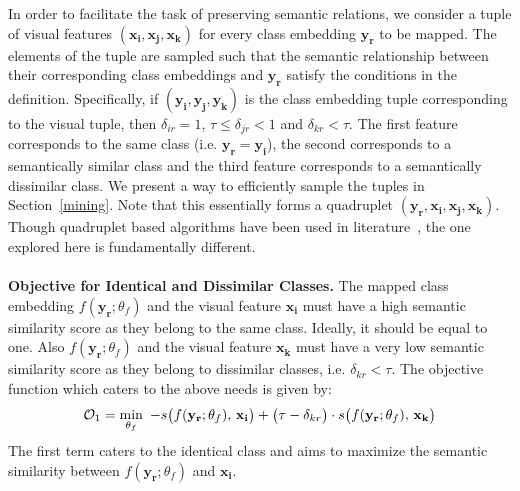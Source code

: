 \documentclass[10pt,twocolumn,letterpaper]{article}
\begin{document}
In order to facilitate the task of preserving semantic relations, we consider a tuple of visual features $(\mathbf{x_i},\mathbf{x_j},\mathbf{x_k})$ for every %
class embedding $\mathbf{y_r}$ to be mapped. 
The elements of the tuple are sampled such that the semantic relationship between their corresponding class embeddings and  $\mathbf{y_r}$ satisfy the conditions in the definition. 
Specifically, if $(\mathbf{y_i},\mathbf{y_j}, \mathbf{y_k})$ is the class embedding tuple corresponding to the visual tuple, then $\delta_{ir} = 1$, $\tau \leq \delta_{jr} < 1$ and $\delta_{kr} < \tau$. 
The first feature corresponds to the same class (i.e. $\mathbf{y_r}=\mathbf{y_i}$), the second corresponds to  a semantically similar class and the third feature corresponds to a semantically dissimilar class.
We present a way to efficiently sample the tuples in Section~\ref{mining}. 
Note that this essentially forms a quadruplet $(\mathbf{y_r},\mathbf{x_i},\mathbf{x_j}, \mathbf{x_k})$. 
Though quadruplet based algorithms have been used in literature~\cite{chen2017beyond}, the one explored here is fundamentally different. %
\\\\
\textbf{Objective for Identical and Dissimilar Classes.} The mapped class embedding $f(\mathbf{y_r};\theta_f)$ and the visual feature $\mathbf{x_i}$ must have a high semantic similarity score as they belong to the same class. Ideally, it should be equal to one. 
Also $f(\mathbf{y_r};\theta_f)$ and the visual feature $\mathbf{x_k}$ must have a very low semantic similarity score as they belong to dissimilar classes, i.e. $\delta_{kr} < \tau$. The objective function which caters to the above needs is given by:
\begin{equation}
\label{normal_loss}
\mathcal{O}_1 = \min_{\theta_f}\ \small{ -s\big(f(\mathbf{y_r};\theta_f),\,\mathbf{x_i}\big) + \big(\tau-\delta_{kr} \big)\cdot  s\big(f(\mathbf{y_r};\theta_f),\,\mathbf{x_k}\big)}
\end{equation}   
The first term caters to the identical class and aims to maximize the semantic similarity between $f(\mathbf{y_r}; \theta_f)$ and $\mathbf{x_i}$. %
\end{document}
